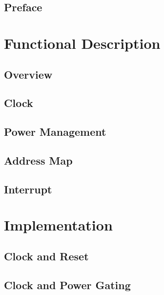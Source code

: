 \documentclass[10pt,oneside]{book}
\begin{document}
\begin{CJK*}{UTF8}{gbsn}




\frontmatter
\chapter{Preface}
\tableofcontents
\listoftables
\listoffigures

\mainmatter

\part{Functional Description}\label{part:func desc}
\chapter{Overview}\label{sec:overview}
\chapter{Clock}\label{sec:clock}
\chapter{Power Management}\label{sec:power management}
\chapter{Address Map}\label{sec:address}
\chapter{Interrupt}\label{sec:interrupt}


\part{Implementation}\label{part:implementation}
\chapter{Clock and Reset}\label{sec:clkrst}
\chapter{Clock and Power Gating}\label{sec:cpg}



\end{CJK*}
\end{document}

